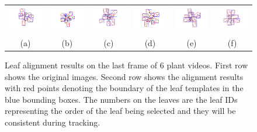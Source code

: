 \begin{figure}
\begin{centering}
\begin{tabular}{c c c c c c}
\includegraphics[trim= 90 60 100 5, clip, width=.14\textwidth]{Figures/AlignPerformance/9_2}&
\includegraphics[trim= 90 60 100 5, clip, width=.14\textwidth]{Figures/AlignPerformance/10_2}&
\includegraphics[trim= 90 60 100 5, clip, width=.14\textwidth]{Figures/AlignPerformance/11_2}&
\includegraphics[trim= 90 60 100 5, clip, width=.14\textwidth]{Figures/AlignPerformance/12_2}&
\includegraphics[trim= 90 60 100 5, clip, width=.14\textwidth]{Figures/AlignPerformance/14_2}&
\includegraphics[trim= 90 60 100 5, clip, width=.14\textwidth]{Figures/AlignPerformance/15_2}\\
(a) & (b) & (c) & (d) & (e) & (f) \\
\end{tabular}
\caption{Leaf alignment results on the last frame of $6$ plant videos. First row shows the original images. Second row shows the alignment results with red points denoting the boundary of the leaf templates in the blue bounding boxes. The numbers on the leaves are the leaf IDs representing the order of the leaf being selected and they will be consistent during tracking.}
\label{fig:alignResult}
\end{centering}
\end{figure}




